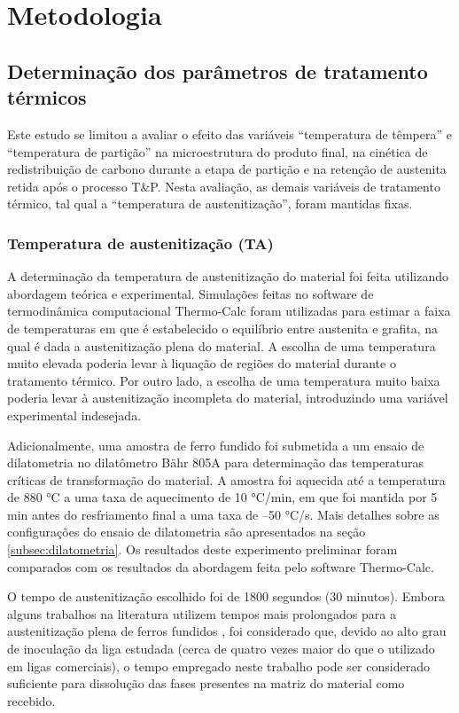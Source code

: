 \section{Metodologia}

\subsection{Determina\c{c}\~{a}o dos par\^{a}metros de tratamento t\'{e}rmicos}

Este estudo se limitou a avaliar o efeito das variáveis ``temperatura de têmpera'' e ``temperatura de partição'' na microestrutura do produto final, na cinética de redistribuição de carbono durante a etapa de partição e na retenção de austenita retida após o processo T\&P. Nesta avaliação, as demais variáveis de tratamento térmico, tal qual a ``temperatura de austenitização'', foram mantidas fixas.

\subsubsection*{Temperatura de austenitização (TA)} 

A determinação da temperatura de austenitização do material foi feita utilizando abordagem teórica e experimental. Simulações feitas no software de termodinâmica computacional Thermo-Calc\textregistered{} foram utilizadas para estimar a faixa de temperaturas em que é estabelecido o equilíbrio entre austenita e grafita, na qual é dada a austenitização plena do material. A escolha de uma temperatura muito elevada poderia levar à liquação de regiões do material durante o tratamento térmico. Por outro lado, a escolha de uma temperatura muito baixa poderia levar à austenitização incompleta do material, introduzindo uma variável experimental indesejada.

Adicionalmente, uma amostra de ferro fundido foi submetida a um ensaio de dilatometria no dilatômetro Bähr 805A para determinação das temperaturas críticas de transformação do material. A amostra foi aquecida até a temperatura de 880 °C a uma taxa de aquecimento de 10 °C/min, em que foi mantida por 5 min antes do resfriamento final a uma taxa de --50 °C/s. Mais detalhes sobre as configurações do ensaio de dilatometria são apresentados na seção \ref{subsec:dilatometria}. Os resultados deste experimento preliminar foram comparados com os resultados da abordagem feita pelo software Thermo-Calc\textregistered{}.

O tempo de austenitização escolhido foi de 1800 segundos (30 minutos). Embora alguns trabalhos na literatura utilizem tempos mais prolongados para a austenitização plena de ferros fundidos \cite{Trudel1997}, foi considerado que, devido ao alto grau de inoculação da liga estudada (cerca de quatro vezes maior do que o utilizado em ligas comerciais), o tempo empregado neste trabalho pode ser considerado suficiente para dissolução das fases presentes na matriz do material como recebido.


